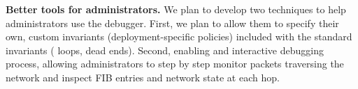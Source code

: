     {\bf Better tools for administrators.} We plan to develop two techniques to help administrators use
    the debugger. First, we plan to allow them to specify their own, custom invariants (deployment-specific policies)
     included with the standard invariants (\eg{} loops, dead ends).
    Second, enabling and interactive debugging process, allowing administrators to step by step monitor
    packets traversing the network and inspect FIB entries and network state at each hop.

